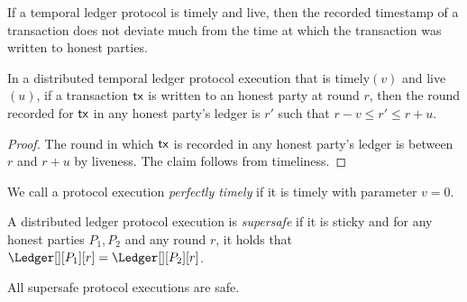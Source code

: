 If a temporal ledger protocol is timely and live, then the recorded timestamp of a transaction does not deviate much from the time at which the transaction was written to honest parties.

\begin{lemma}
  In a distributed temporal ledger protocol execution that is timely$(v)$ and live$(u)$, if a transaction $\textsf{tx}$ is written to an honest party at round $r$, then the round recorded for $\textsf{tx}$ in any honest party's ledger is $r'$ such that $r - v \leq r' \leq r + u$.
\end{lemma}
\begin{proof}
  The round in which $\textsf{tx}$ is recorded in any honest party's ledger is between $r$ and $r + u$ by liveness. The claim follows from timeliness.
\end{proof}

\begin{definition}
  We call a protocol execution \emph{perfectly timely} if it is timely with parameter $v = 0$.
\end{definition}

\begin{definition}[Supersafety]
  A distributed ledger protocol execution is \emph{supersafe} if it is sticky and
  for any honest parties $P_1, P_2$ and any round $r$, it holds that
  $\Ledger[][P_1][r] = \Ledger[][P_2][r]$.
\end{definition}

All supersafe protocol executions are safe.
